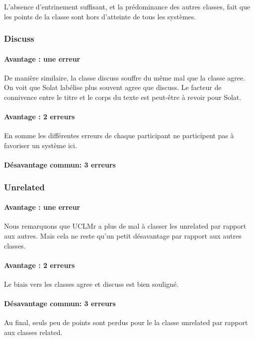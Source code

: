 \documentclass[onecolumn, 12pt]{article}
\begin{document}
 L'absence d'entrinement suffisant, et la prédominance des autres classes, fait que les points de la classe sont hors d'atteinte de tous les systèmes.
 \subsubsection{Discuss}
 \paragraph{Avantage : une erreur}
 
 De manière similaire, la classe discuss souffre du même mal que la classe agree.
 On voit que Solat labélise plus souvent agree que discuss.
 Le facteur de connivence entre le titre et le corps du texte est peut-être à revoir pour Solat.
 
 \paragraph{Avantage : 2 erreurs}
 
 En somme les différentes erreurs de chaque participant ne participent pas à favoriser un système ici.
 \paragraph{Désavantage commun: 3 erreurs}
 
 
 \subsubsection{Unrelated}
 \paragraph{Avantage : une erreur}
 
 Nous remarquons que UCLMr a plus de mal à classer les unrelated par rapport aux autres.
 Mais cela ne reste qu'un petit désavantage par rapport aux autres classes.
 \paragraph{Avantage : 2 erreurs}
 
 Le biais vers les classes agree et discuss est bien souligné.
 \paragraph{Désavantage commun: 3 erreurs}
 
 Au  final,  seuls peu de points sont perdus pour le la classe unrelated par rapport aux classes related.
 
\end{document}
